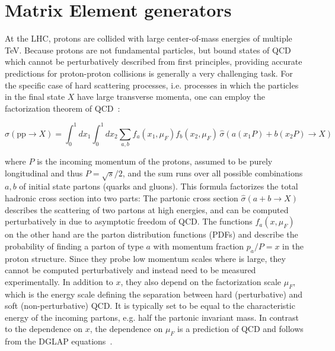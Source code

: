 \section{Matrix Element generators}
\label{sec:mc:me}


At the LHC, protons are collided with large center-of-mass energies of multiple TeV. Because protons are not fundamental particles, but bound states of QCD which cannot be perturbatively described from first principles, providing accurate predictions for proton-proton collisions is generally a very challenging task. For the specific case of hard scattering processes, i.e. processes in which the particles in the final state $X$ have large transverse momenta, one can employ the factorization theorem of QCD~\cite{Peskin:1995ev}:

\begin{equation}
\label{eq:mc:sigmahad}
    \sigma (\mathrm{pp} \rightarrow X) = \int_{0}^{1} dx_1 \int_{0}^{1} dx_2 \sum_ {a,b} f_a (x_1, \mu_F) f_b (x_2, \mu_F) \, \hat{\sigma} (a (x_1 P) + b (x_2 P) \rightarrow X)
\end{equation}

\noindent where $P$ is the incoming momentum of the protons, assumed to be purely longitudinal and thus $P = \sqrt{s}/2$, and the sum runs over all possible combinations $a,b$ of initial state partons (quarks and gluons). This formula factorizes the total hadronic cross section into two parts: The partonic cross section $\hat{\sigma} (a + b \rightarrow X)$ describes the scattering of two partons at high energies, and can be computed perturbatively in \alphas due to asymptotic freedom of QCD. The functions $f_a(x, \mu_F)$  on the other hand are the parton distribution functions (PDFs) and describe the probability of finding a parton of type $a$ with momentum fraction $p_a / P = x$ in the proton structure. Since they probe low momentum scales where \alphas is large, they cannot be computed perturbatively and instead need to be measured experimentally. In addition to $x$, they also depend on the factorization scale $\mu_F$, which is the energy scale defining the separation between hard (perturbative) and soft (non-perturbative) QCD. It is typically set to be equal to the characteristic energy of the incoming partons, e.g. half the partonic invariant mass. In contrast to the dependence on $x$, the dependence on $\mu_F$ is a prediction of QCD and follows from the DGLAP equations~\cite{Altarelli:1977zs,Skands:2012ts}.

